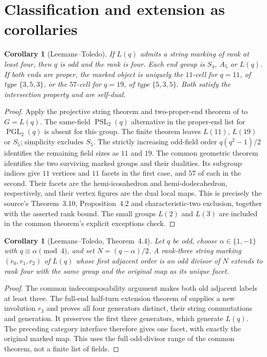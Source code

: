 \documentclass[11pt]{article}
\newtheorem{corollary}[theorem]{Corollary}
\newcommand{\PSL}{\operatorname{PSL}_2}
\newcommand{\PGL}{\operatorname{PGL}_2}
\begin{document}
\section{Classification and extension as corollaries}
\begin{corollary}[Leemans--Toledo]\label{cor:classification}
If $L(q)$ admits a string marking of rank at least four, then $q$ is odd
and the rank is four. Each end group is $S_4$, $A_5$ or $L(q)$.
If both ends are proper, the marked object is uniquely the $11$-cell for
$q=11$, of type $\{3,5,3\}$, or the $57$-cell for $q=19$, of type
$\{5,3,5\}$. Both satisfy the intersection property and are self-dual.
\end{corollary}
\begin{proof}
Apply the projective string theorem and two-proper-end theorem of
\cite[Theorems~4 and~6]{U} to $G=L(q)$. The same-field $\PSL(q)$ alternative in the
proper-end list for $\PGL(q)$ is absent for this group. The finite
theorem leaves $L(11)$, $L(19)$ or $S_5$; simplicity excludes $S_5$.
The strictly increasing odd-field order $q(q^2-1)/2$ identifies the
remaining field sizes as $11$ and $19$. The common geometric theorem
identifies the two surviving marked groups and their
dualities. Its subgroup indices give $11$ vertices and $11$ facets in
the first case, and $57$ of each in the second. Their facets are the
hemi-icosahedron and hemi-dodecahedron, respectively, and their vertex
figures are the dual local maps. This is precisely the source's
Theorem~3.10, Proposition~4.2 and characteristic-two exclusion, together
with the asserted rank bound. The small groups $L(2)$ and $L(3)$ are
included in the common theorem's explicit exceptions check.
\end{proof}

\begin{corollary}[Leemans--Toledo, Theorem~4.4]\label{cor:extension}
Let $q$ be odd, choose $\alpha\in\{1,-1\}$ with
$q\equiv\alpha\pmod4$, and set $N=(q-\alpha)/2$. A rank-three string
marking $(r_0,r_1,r_2)$ of $L(q)$ whose first adjacent order is an odd
divisor of $N$ extends to rank four with the same group and the original
map as its unique facet.
\end{corollary}
\begin{proof}
The common indecomposability argument makes both old adjacent labels
at least three. The full-end half-turn extension theorem of
\cite[Theorem~9]{U} supplies a new
involution $r_3$ and proves all four generators distinct, their string
commutations and generation. It preserves the first three generators,
which generate $L(q)$. The preceding category interface therefore gives
one facet, with exactly the original marked map. This uses the full
odd-divisor range of the common theorem, not a finite list of fields.
\end{proof}
\end{document}
